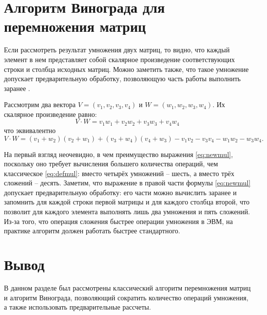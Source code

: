 \section{Алгоритм Винограда для перемножения матриц}

Если рассмотреть результат умножения двух матриц, то видно, что каждый элемент в нем представляет собой скалярное произведение соответствующих строки и столбца исходных матриц.
Можно заметить также, что такое умножение допускает предварительную обработку, позволяющую часть работы выполнить заранее  \cite{win-book}. 

Рассмотрим два вектора $V = (v_1, v_2, v_3, v_4)$ и $W = (w_1, w_2, w_3, w_4)$. Их скалярное произведение равно:
\begin{equation}
	\label{eq:defmul}
	V \cdot W = v_1w_1 + v_2w_2 + v_3w_3 + v_4w_4
\end{equation}
что эквивалентно
\begin{equation}
	\label{eq:newmul}
		V \cdot W = (v_1 + w_2)(v_2 + w_1) + (v_3 + w_4)(v_4 + w_3) - v_1v_2 - v_3v_4 - w_1w_2 - w_3w_4.
\end{equation}

На первый взгляд неочевидно, в чем преимущество выражения \ref{eq:newmul}, поскольку оно требует вычисления большего 
количества операций, чем классическое \ref{eq:defmul}:
вместо четырёх умножений -- шесть, а вместо трёх сложений -- десять. Заметим, что выражение в правой части формулы \ref{eq:newmul}
допускает предварительную обработку: его части можно вычислить заранее и запомнить для каждой строки первой матрицы
и для каждого столбца второй, что позволит для каждого элемента выполнять лишь два умножения и пять сложений.
Из-за того, что операция сложения быстрее операции умножения в ЭВМ, на практике алгоритм должен работать быстрее стандартного.


\section{Вывод}

В данном разделе был рассмотрены классический алгоритм перемножения матриц и алгоритм Винограда, позволяющий сократить количество операций умножения, 
а также использовать предварительные рассчеты.